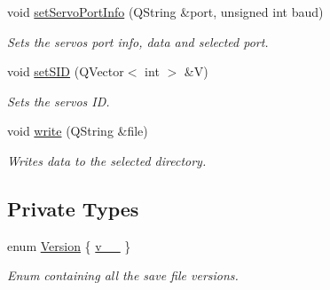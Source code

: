 \begin{DoxyCompactItemize}
void \hyperlink{class_servo_thread_a76af3e89d1a8705426584bedb0624909}{set\+Servo\+Port\+Info} (Q\+String \&port, unsigned int baud)
\begin{DoxyCompactList}\small\item\em Sets the servos port info, data and selected port. \end{DoxyCompactList}\item 
void \hyperlink{class_servo_thread_ac3471e5020f5d9babd3f2ff7b3b82aca}{set\+S\+I\+D} (Q\+Vector$<$ int $>$ \&V)
\begin{DoxyCompactList}\small\item\em Sets the servos I\+D. \end{DoxyCompactList}\item 
void \hyperlink{class_servo_thread_ae5753b8c12768d2115ff900f0ab8e13c}{write} (Q\+String \&file)
\begin{DoxyCompactList}\small\item\em Writes data to the selected directory. \end{DoxyCompactList}\end{DoxyCompactItemize}
\subsection*{Private Types}
\begin{DoxyCompactItemize}
\item 
enum \hyperlink{class_servo_thread_aeccce0ac6a969e2ee7cbe91687e2d085}{Version} \{ \hyperlink{class_servo_thread_aeccce0ac6a969e2ee7cbe91687e2d085a319b6bf2cb120faeefbd0a5118ece7e3}{v\+\_\+\_}
 \}
\begin{DoxyCompactList}\small\item\em Enum containing all the save file versions. \end{DoxyCompactList}\end{DoxyCompactItemize}
